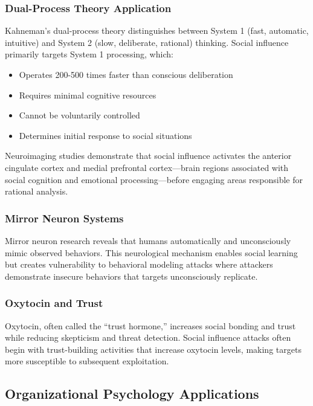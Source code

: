 \documentclass[11pt,a4paper]{article}
\begin{document}
\subsubsection{Dual-Process Theory Application}

Kahneman's dual-process theory\cite{kahneman2011} distinguishes between System 1 (fast, automatic, intuitive) and System 2 (slow, deliberate, rational) thinking. Social influence primarily targets System 1 processing, which:

\begin{itemize}
\item Operates 200-500 times faster than conscious deliberation
\item Requires minimal cognitive resources
\item Cannot be voluntarily controlled
\item Determines initial response to social situations
\end{itemize}

Neuroimaging studies demonstrate that social influence activates the anterior cingulate cortex and medial prefrontal cortex—brain regions associated with social cognition and emotional processing—before engaging areas responsible for rational analysis\cite{klucharev2009}.

\subsubsection{Mirror Neuron Systems}

Mirror neuron research\cite{rizzolatti2004} reveals that humans automatically and unconsciously mimic observed behaviors. This neurological mechanism enables social learning but creates vulnerability to behavioral modeling attacks where attackers demonstrate insecure behaviors that targets unconsciously replicate.

\subsubsection{Oxytocin and Trust}

Oxytocin, often called the ``trust hormone,'' increases social bonding and trust while reducing skepticism and threat detection\cite{kosfeld2005}. Social influence attacks often begin with trust-building activities that increase oxytocin levels, making targets more susceptible to subsequent exploitation.

\subsection{Organizational Psychology Applications}
\end{document}
